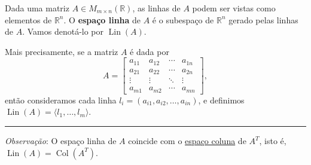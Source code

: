 \begin{definition}
	Dada uma matriz $A\in M_{m\times n}(\mathbb{R})$, as linhas de $A$ podem ser vistas como elementos de $\mathbb{R}^n$. O \textbf{espaço linha} de $A$ é o subespaço de $\mathbb{R}^n$ gerado pelas linhas de $A$. Vamos denotá-lo por $\operatorname{Lin}(A)$.

	Mais precisamente, se a matriz $A$ é dada por
	\[A=\begin{bmatrix}
		a_{11}
			&a_{12}
				&\cdots
					&a_{1n}\\
		a_{21}
			&a_{22}
				&\cdots
					&a_{2n}\\
		\vdots
			&\vdots
				&\ddots
					&\vdots\\
		a_{m1}
			&a_{m2}
				&\cdots
					&a_{mn}
		\end{bmatrix},\]
	então consideramos cada linha $l_i=(a_{i1},a_{i2},\ldots,a_{in})$, e definimos $\operatorname{Lin}(A)=\langle l_1,\ldots,l_m\rangle$.
	
	\hrule
	
	\textit{Observação}: O espaço linha de $A$ coincide com o \href{http://mtm.ufsc.br/~cordeiro/ensino/mtm3112.algebra.linear/08.espacos.de.matrizes/con_esp_coluna_moodle.html}{espaço coluna} de $A^T$, isto é, $\operatorname{Lin}(A)=\operatorname{Col}(A^T)$.
\end{definition}